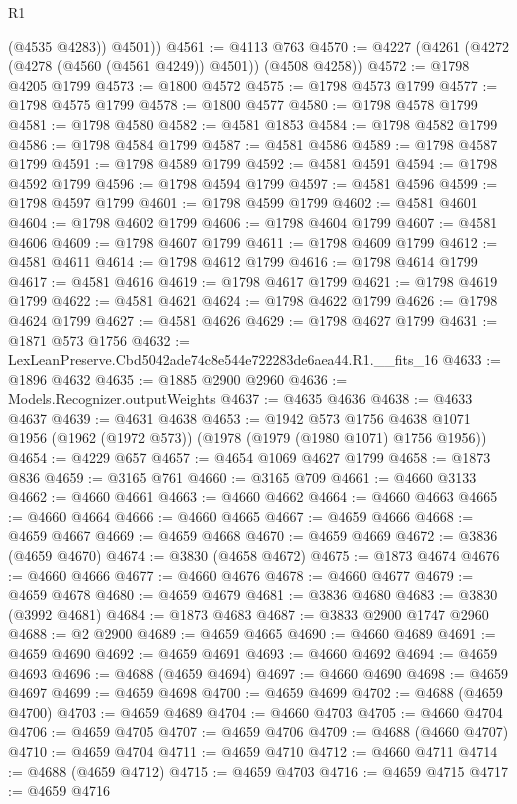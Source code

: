 \begin{lexlean}{R1}
\begin{coremodule}
          (@4535 @4283))
        @4501))
@4561 := @4113 @763
@4570 := @4227 (@4261 (@4272 (@4278 (@4560 (@4561 @4249)) @4501)) (@4508 @4258))
@4572 := @1798 @4205 @1799
@4573 := @1800 @4572
@4575 := @1798 @4573 @1799
@4577 := @1798 @4575 @1799
@4578 := @1800 @4577
@4580 := @1798 @4578 @1799
@4581 := @1798 @4580
@4582 := @4581 @1853
@4584 := @1798 @4582 @1799
@4586 := @1798 @4584 @1799
@4587 := @4581 @4586
@4589 := @1798 @4587 @1799
@4591 := @1798 @4589 @1799
@4592 := @4581 @4591
@4594 := @1798 @4592 @1799
@4596 := @1798 @4594 @1799
@4597 := @4581 @4596
@4599 := @1798 @4597 @1799
@4601 := @1798 @4599 @1799
@4602 := @4581 @4601
@4604 := @1798 @4602 @1799
@4606 := @1798 @4604 @1799
@4607 := @4581 @4606
@4609 := @1798 @4607 @1799
@4611 := @1798 @4609 @1799
@4612 := @4581 @4611
@4614 := @1798 @4612 @1799
@4616 := @1798 @4614 @1799
@4617 := @4581 @4616
@4619 := @1798 @4617 @1799
@4621 := @1798 @4619 @1799
@4622 := @4581 @4621
@4624 := @1798 @4622 @1799
@4626 := @1798 @4624 @1799
@4627 := @4581 @4626
@4629 := @1798 @4627 @1799
@4631 := @1871 @573 @1756
@4632 := LexLeanPreserve.Cbd5042ade74c8e544e722283de6aea44.R1.__fits_16
@4633 := @1896 @4632
@4635 := @1885 @2900 @2960
@4636 := Models.Recognizer.outputWeights
@4637 := @4635 @4636
@4638 := @4633 @4637
@4639 := @4631 @4638
@4653 := @1942
    @573
    @1756
    @4638
    @1071
    @1956
    (@1962 (@1972 @573))
    (@1978 (@1979 (@1980 @1071) @1756 @1956))
@4654 := @4229 @657
@4657 := @4654 @1069 @4627 @1799
@4658 := @1873 @836
@4659 := @3165 @761
@4660 := @3165 @709
@4661 := @4660 @3133
@4662 := @4660 @4661
@4663 := @4660 @4662
@4664 := @4660 @4663
@4665 := @4660 @4664
@4666 := @4660 @4665
@4667 := @4659 @4666
@4668 := @4659 @4667
@4669 := @4659 @4668
@4670 := @4659 @4669
@4672 := @3836 (@4659 @4670)
@4674 := @3830 (@4658 @4672)
@4675 := @1873 @4674
@4676 := @4660 @4666
@4677 := @4660 @4676
@4678 := @4660 @4677
@4679 := @4659 @4678
@4680 := @4659 @4679
@4681 := @3836 @4680
@4683 := @3830 (@3992 @4681)
@4684 := @1873 @4683
@4687 := @3833 @2900 @1747 @2960
@4688 := @2 @2900
@4689 := @4659 @4665
@4690 := @4660 @4689
@4691 := @4659 @4690
@4692 := @4659 @4691
@4693 := @4660 @4692
@4694 := @4659 @4693
@4696 := @4688 (@4659 @4694)
@4697 := @4660 @4690
@4698 := @4659 @4697
@4699 := @4659 @4698
@4700 := @4659 @4699
@4702 := @4688 (@4659 @4700)
@4703 := @4659 @4689
@4704 := @4660 @4703
@4705 := @4660 @4704
@4706 := @4659 @4705
@4707 := @4659 @4706
@4709 := @4688 (@4660 @4707)
@4710 := @4659 @4704
@4711 := @4659 @4710
@4712 := @4660 @4711
@4714 := @4688 (@4659 @4712)
@4715 := @4659 @4703
@4716 := @4659 @4715
@4717 := @4659 @4716

\end{coremodule}
\end{lexlean}
